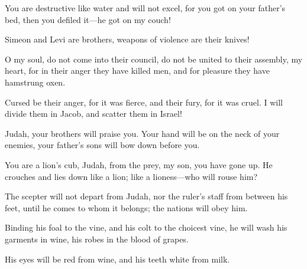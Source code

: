 \begin{scripture}
 You are destructive like water and will not excel, for you got on your father's bed, then you defiled it---he got on my couch!
\everypar{}

 Simeon and Levi are brothers, weapons of violence are their knives!
\everypar{}

 O my soul, do not come into their council, do not be united to their assembly, my heart, for in their anger they have killed men, and for pleasure they have hamstrung oxen.
\everypar{}

 Cursed be their anger, for it was fierce, and their fury, for it was cruel. I will divide them in Jacob, and scatter them in Israel!
\everypar{}

 Judah, your brothers will praise you. Your hand will be on the neck of your enemies, your father's sons will bow down before you.
\everypar{}

 You are a lion's cub, Judah, from the prey, my son, you have gone up. He crouches and lies down like a lion; like a lioness---who will rouse him?
\everypar{}

 The scepter will not depart from Judah, nor the ruler's staff from between his feet, until he comes to whom it belongs; the nations will obey him.
\everypar{}

 Binding his foal to the vine, and his colt to the choicest vine, he will wash his garments in wine, his robes in the blood of grapes.
\everypar{}

 His eyes will be red from wine, and his teeth white from milk.
\everypar{}


\end{scripture}
